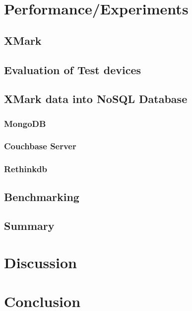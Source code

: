 \documentclass[a4paper,12pt]{article}
\begin{document}
	\section{Performance/Experiments}
	\label{sec:four}
		\subsection{XMark}
		\label{xmark}
			
		\subsection{Evaluation of Test devices}
		\subsection{XMark data into NoSQL Database}
			\label{xmark-nosql}
			
			\newpage			
			\subsubsection{MongoDB}
			\label{xmark-mongodb}
			
			\subsubsection{Couchbase Server}
			\label{xmark-couchbase}
			
			\subsubsection{Rethinkdb}
			\label{xmark-rethinkdb}
					
		\subsection{Benchmarking}
		\subsection{Summary}
	\newpage
	\section{Discussion}
	\section{Conclusion}
	\label{conc}
	
	\newpage
\end{document}
